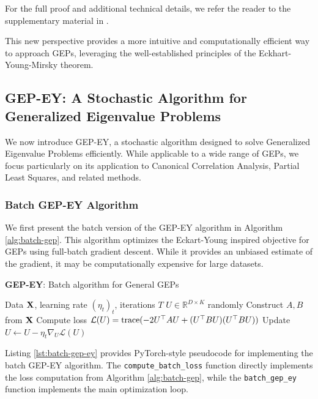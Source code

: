 For the full proof and additional technical details, we refer the reader to the supplementary material in \citet{chapman2023efficient}.

This new perspective provides a more intuitive and computationally efficient way to approach GEPs, leveraging the well-established principles of the Eckhart-Young-Mirsky theorem.

\subsection{GEP-EY: A Stochastic Algorithm for Generalized Eigenvalue Problems}

We now introduce GEP-EY, a stochastic algorithm designed to solve Generalized Eigenvalue Problems efficiently. While applicable to a wide range of GEPs, we focus particularly on its application to Canonical Correlation Analysis, Partial Least Squares, and related methods.

\subsubsection{Batch GEP-EY Algorithm}

We first present the batch version of the GEP-EY algorithm in Algorithm \ref{alg:batch-gep}. This algorithm optimizes the Eckart-Young inspired objective for GEPs using full-batch gradient descent. While it provides an unbiased estimate of the gradient, it may be computationally expensive for large datasets.

\begin{algorithm}
\caption{\textbf{GEP-EY}: Batch algorithm for General GEPs}
\label{alg:batch-gep}
\begin{algorithmic}
 Data $\mathbf{X}$, learning rate $(\eta_t)_t$, iterations $T$
 $U \in \mathbb{R}^{D \times K}$ randomly
\STATE Construct $A, B$ from $\mathbf{X}$
\STATE Compute loss $\mathcal{L}(U) = \operatorname{trace}(-2U^\top A U + (U^\top B U)(U^\top B U))$
\STATE Update $U \leftarrow U - \eta_t \nabla_U \mathcal{L}(U)$
\ENDFOR
\end{algorithmic}
\end{algorithm}

Listing \ref{lst:batch-gep-ey} provides PyTorch-style pseudocode for implementing the batch GEP-EY algorithm. The \texttt{compute\_batch\_loss} function directly implements the loss computation from Algorithm \ref{alg:batch-gep}, while the \texttt{batch\_gep\_ey} function implements the main optimization loop.

